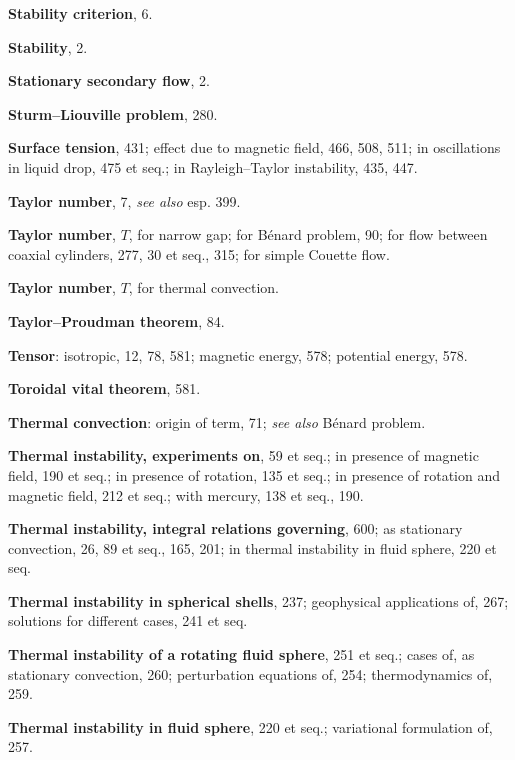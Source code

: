 \begin{small}
\medskip\noindent
\textbf{Stability criterion}, 6.

\medskip\noindent
\textbf{Stability}, 2.

\medskip\noindent
\textbf{Stationary secondary flow}, 2.

\medskip\noindent
\textbf{Sturm--Liouville problem}, 280.

\medskip\noindent
\textbf{Surface tension}, 431;
  effect due to magnetic field, 466, 508,
    511;
  in oscillations in liquid drop, 475 et seq.;
  in Rayleigh--Taylor instability, 435, 447.

\bigskip\noindent
\textbf{Taylor number}, 7, \textit{see also} esp. 399.

\medskip\noindent
\textbf{Taylor number}, $T$, for narrow gap;
  for B\'enard problem, 90;
  for flow between coaxial cylinders, 277,
    30 et seq., 315;
  for simple Couette flow.

\medskip\noindent
\textbf{Taylor number}, $T$, for thermal convection.

\medskip\noindent
\textbf{Taylor--Proudman theorem}, 84.

\medskip\noindent
\textbf{Tensor}:
  isotropic, 12, 78, 581;
  magnetic energy, 578;
  potential energy, 578.

\medskip\noindent
\textbf{Toroidal vital theorem}, 581.

\medskip\noindent
\textbf{Thermal convection}:
  origin of term, 71;
  \textit{see also} B\'enard problem.

\medskip\noindent
\textbf{Thermal instability, experiments on}, 59 et
  seq.;
  in presence of magnetic field, 190 et seq.;
  in presence of rotation, 135 et seq.;
  in presence of rotation and magnetic
    field, 212 et seq.;
  with mercury, 138 et seq., 190.

\medskip\noindent
\textbf{Thermal instability, integral relations
  governing}, 600;
  as stationary convection, 26, 89 et seq.,
    165, 201;
  in thermal instability in fluid sphere, 220 et
    seq.

\medskip\noindent
\textbf{Thermal instability in spherical shells}, 237;
  geophysical applications of, 267;
  solutions for different cases, 241 et seq.

\medskip\noindent
\textbf{Thermal instability of a rotating fluid
  sphere}, 251 et seq.;
  cases of, as stationary convection, 260;
  perturbation equations of, 254;
  thermodynamics of, 259.

\medskip\noindent
\textbf{Thermal instability in fluid sphere}, 220 et
  seq.;
  variational formulation of, 257.


\end{small}
